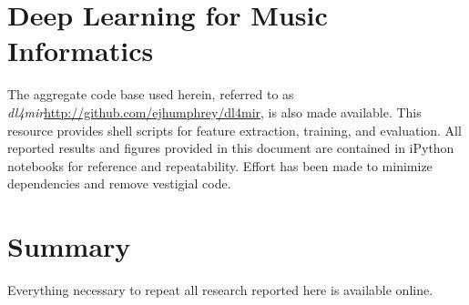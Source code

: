 \section{Deep Learning for Music Informatics}
\label{sec:dl4mir}

The aggregate code base used herein, referred to as \emph{dl4mir}\url{http://github.com/ejhumphrey/dl4mir}, is also made available.
This resource provides shell scripts for feature extraction, training, and evaluation.
All reported results and figures provided in this document are contained in iPython notebooks for reference and repeatability.
Effort has been made to minimize dependencies and remove vestigial code.


\section{Summary}
\label{sec:summary}

Everything necessary to repeat all research reported here is available online.

